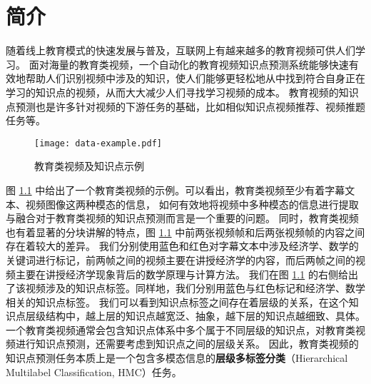 
\chapter{简介}
    随着线上教育模式的快速发展与普及，互联网上有越来越多的教育视频可供人们学习。
    面对海量的教育类视频，一个自动化的教育视频知识点预测系统能够快速有效地帮助人们识别视频中涉及的知识，使人们能够更轻松地从中找到符合自身正在学习的知识点的视频，从而大大减少人们寻找学习视频的成本。
    教育视频的知识点预测也是许多针对视频的下游任务的基础，比如相似知识点视频推荐、视频推题任务等。

    \begin{figure}[t]
        \centering
        \texttt{[image: data-example.pdf]}
        \caption{教育类视频及知识点示例}
        \label{fig1.1}
    \end{figure}

    图 \ref{fig1.1} 中给出了一个教育类视频的示例。可以看出，教育类视频至少有着字幕文本、视频图像这两种模态的信息，
    如何有效地将视频中多种模态的信息进行提取与融合对于教育类视频的知识点预测而言是一个重要的问题。
    同时，教育类视频也有着显著的分块讲解的特点，图 \ref{fig1.1} 中前两张视频帧和后两张视频帧的内容之间存在着较大的差异。
    我们分别使用蓝色和红色对字幕文本中涉及经济学、数学的关键词进行标记，前两帧之间的视频主要在讲授经济学的内容，而后两帧之间的视频主要在讲授经济学现象背后的数学原理与计算方法。
    我们在图 \ref{fig1.1} 的右侧给出了该视频涉及的知识点标签。同样地，我们分别用蓝色与红色标记和经济学、数学相关的知识点标签。
    我们可以看到知识点标签之间存在着层级的关系，在这个知识点层级结构中，越上层的知识点越宽泛、抽象，越下层的知识点越细致、具体。
    一个教育类视频通常会包含知识点体系中多个属于不同层级的知识点，对教育类视频进行知识点预测，还需要考虑到知识点之间的层级关系。
    因此，教育类视频的知识点预测任务本质上是一个包含多模态信息的\textbf{层级多标签分类}（Hierarchical Multilabel Classification, HMC）任务。

